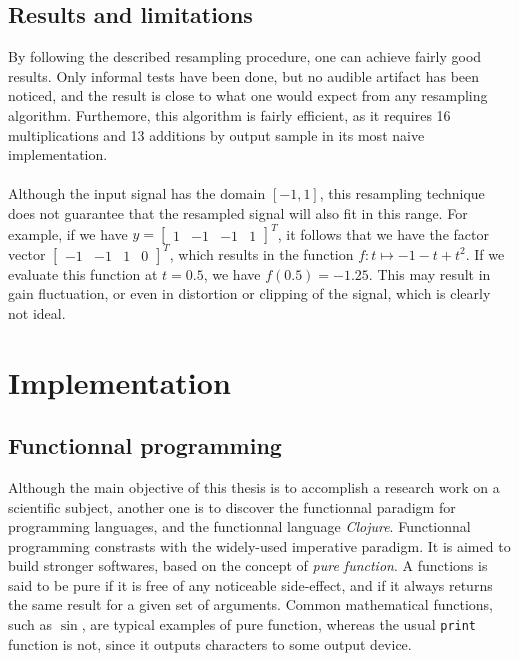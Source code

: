 \documentclass[letterpaper]{article}
\newcommand*{\codeinl}{\texttt}
\theoremstyle{definition}
\theoremstyle{remark}
\begin{document}
\subsection{Results and limitations}
By following the described resampling procedure, one can achieve fairly good
results. Only informal tests have been done, but no audible artifact has been
noticed, and the result is close to what one would expect from any resampling
algorithm. Furthemore, this algorithm is fairly efficient, as it requires
16 multiplications and 13 additions by output sample in its most naive
implementation.

\paragraph{}
Although the input signal has the domain \([-1,1]\), this resampling technique
does not guarantee that the resampled signal will also fit in this range. For
example, if we have
\(y=\begin{bmatrix}1&-1&-1&1\end{bmatrix}^T\), it follows
that we have the factor vector
\(\begin{bmatrix}-1&-1&1&0\end{bmatrix}^T\), which results
in the function \(f:t\mapsto -1-t+t^2\). If we evaluate this function at
\(t=0.5\), we have \(f(0.5)=-1.25\).  This may result in gain fluctuation, or
even in distortion or clipping of the signal, which is clearly not ideal.

\section{Implementation}

\subsection{Functionnal programming}
Although the main objective of this thesis is to accomplish a research work on a
scientific subject, another one is to discover the functionnal paradigm for
programming languages, and the functionnal language \emph{Clojure}. Functionnal
programming constrasts with the widely-used imperative paradigm. It is aimed to
build stronger softwares, based on the concept of \emph{pure function}. A
functions is said to be pure if it is free of any noticeable side-effect, and if
it always returns the same result for a given set of arguments. Common
mathematical functions, such as \(\sin\), are typical examples of pure function,
whereas the usual \codeinl{print} function is not, since it outputs characters
to some output device.
\end{document}
